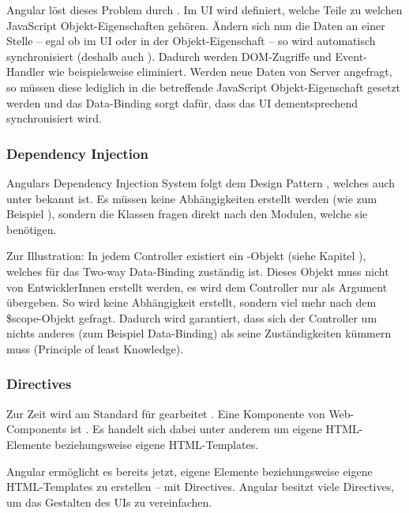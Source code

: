 Angular löst dieses Problem durch . Im UI wird definiert, welche Teile zu welchen JavaScript Objekt-Eigenschaften gehören. Ändern sich nun die Daten an einer Stelle -- egal ob im UI oder in der Objekt-Eigenschaft -- so wird automatisch synchronisiert (deshalb auch ). Dadurch werden DOM-Zugriffe und Event-Handler wie beispielsweise  eliminiert. Werden neue Daten von Server angefragt, so müssen diese lediglich in die betreffende JavaScript Objekt-Eigenschaft gesetzt werden und das Data-Binding sorgt dafür, dass das UI dementsprechend synchronisiert wird.

\subsubsection{Dependency Injection}
Angulars Dependency Injection System folgt dem Design Pattern , welches auch unter  bekannt ist. Es müssen keine Abhängigkeiten erstellt werden (wie zum Beispiel ), sondern die Klassen fragen direkt nach den Modulen, welche sie benötigen.

Zur Illustration: In jedem Controller existiert ein -Objekt (siehe Kapitel ), welches für das Two-way Data-Binding zuständig ist. Dieses Objekt muss nicht von EntwicklerInnen erstellt werden, es wird dem Controller nur als Argument übergeben. So wird keine Abhängigkeit erstellt, sondern viel mehr nach dem \$scope-Objekt gefragt. Dadurch wird garantiert, dass sich der Controller um nichts anderes (zum Beispiel Data-Binding) als seine Zuständigkeiten kümmern muss (Principle of least Knowledge).

\subsubsection{Directives}
Zur Zeit wird am Standard für  gearbeitet \autocite{Glazkov:13:IWC}. Eine Komponente von Web-Components ist . Es handelt sich dabei unter anderem um eigene HTML-Elemente beziehungsweise eigene HTML-Templates.

Angular ermöglicht es bereits jetzt, eigene Elemente beziehungsweise eigene HTML-Templates zu erstellen -- mit Directives. Angular besitzt viele Directives, um das Gestalten des UIs zu vereinfachen.

